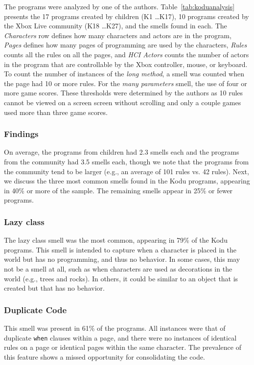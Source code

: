 \documentclass{sig-alternate}
\begin{document}
The programs were analyzed  by one of the authors. Table~\ref{tab:koduanalysis} presents the 17 programs created by children (K1 \dots K17), 10 programs created by the Xbox Live community (K18 \dots K27), and the smells found in each. The \emph{Characters} row defines how many characters and actors are in the program, \emph{Pages} defines how many pages of programming are used by the characters, \emph{Rules} counts all the rules on all the pages, and \emph{HCI Actors} counts the number of actors in the program that are controllable by the Xbox controller, mouse, or keyboard. 
To count the number of instances of the \emph{long method}, a smell was counted when the page had 10 or more rules. For the  \emph{many parameters} smell, the use of four or more game scores. These thresholds were determined by the authors as 10 rules cannot be viewed on a screen screen without scrolling and only a couple games used more than three game scores. 

\subsubsection{Findings}
On average, the programs from children had 2.3 smells each and the programs from the community had 3.5 smells each, though we note that the programs from the community tend to be larger (e.g., an average of 101 rules vs. 42 rules). Next, we discuss the three most common smells found in the Kodu programs, appearing in 40\% or more of the sample. The remaining smells appear in 25\% or fewer programs. 

\subsubsection{Lazy class}
The lazy class smell was the most common, appearing in 79\% of the Kodu programs. This smell is intended to capture when a character is placed in the world but has no programming, and thus no behavior. In some cases, this may not be a smell at all, such as when characters are used as decorations in the world (e.g., trees and rocks). In others, it could be similar to an object that is created but that has no behavior. 

\subsubsection{Duplicate Code}
This smell was present in 61\% of the programs. All instances were that of duplicate {\tt when} clauses within a page, and there were no instances of identical rules on a page or identical pages within the same character. The prevalence of this feature shows a missed opportunity for consolidating the code. 
\end{document}
